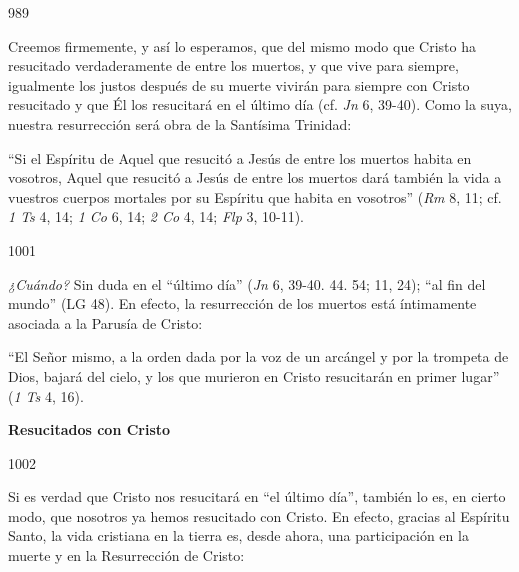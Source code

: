 			\begin{ccebody}\begin{ccenumber}989\end{ccenumber} Creemos firmemente, y así lo esperamos, que del mismo modo que Cristo ha resucitado verdaderamente de entre los muertos, y que vive para siempre, igualmente los justos después de su muerte vivirán para siempre con Cristo resucitado y que Él los resucitará en el último día (cf. \textit{Jn} 6, 39-40). Como la suya, nuestra resurrección será obra de la Santísima Trinidad:\end{ccebody}
			
			\begin{ccecite}“Si el Espíritu de Aquel que resucitó a Jesús de entre los muertos habita en vosotros, Aquel que resucitó a Jesús de entre los muertos dará también la vida a vuestros cuerpos mortales por su Espíritu que habita en vosotros” (\textit{Rm} 8, 11; cf. \textit{1 Ts} 4, 14; \textit{1 Co} 6, 14; \textit{2 Co} 4, 14; \textit{Flp} 3, 10-11).\end{ccecite}
			
			\begin{ccebody}\begin{ccenumber}1001\end{ccenumber} \textit{¿Cuándo?} Sin duda en el “último día” (\textit{Jn} 6, 39-40. 44. 54; 11, 24); “al fin del mundo” (LG 48). En efecto, la resurrección de los muertos está íntimamente asociada a la Parusía de Cristo:\end{ccebody}
			
			\begin{ccecite}“El Señor mismo, a la orden dada por la voz de un arcángel y por la trompeta de Dios, bajará del cielo, y los que murieron en Cristo resucitarán en primer lugar” (\textit{1 Ts} 4, 16).\end{ccecite}
			
			\begin{ccebody}\textbf{Resucitados con Cristo}\end{ccebody}
			
			\begin{ccebody}\begin{ccenumber}1002\end{ccenumber} Si es verdad que Cristo nos resucitará en “el último día”, también lo es, en cierto modo, que nosotros ya hemos resucitado con Cristo. En efecto, gracias al Espíritu Santo, la vida cristiana en la tierra es, desde ahora, una participación en la muerte y en la Resurrección de Cristo:\end{ccebody}
			
